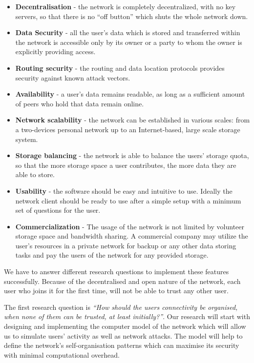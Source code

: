\begin{itemize}
\item \textbf{Decentralisation} - the network is completely decentralized,
      with no key servers, so that there is no ``off button'' which shuts
      the whole network down.
\item \textbf{Data Security} - all the user's data which is stored and transferred
      within the network is accessible only by its owner or a party to whom the
      owner is explicitly providing access.
\item \textbf{Routing security} - the routing and data location protocols
      provides security against known attack vectors.
\item \textbf{Availability} - a user's data remains readable,
      as long as a sufficient amount of peers who hold that data remain online.
\item \textbf{Network scalability} - the network can be established in various
      scales: from a two-devices personal network up to an Internet-based,
      large scale storage system.
\item \textbf{Storage balancing} - the network is able to balance the users'
      storage quota, so that the more storage space a user contributes,
      the more data they are able to store.
\item \textbf{Usability} - the software should be easy and intuitive to
      use. Ideally the network client should be ready to use after a
      simple setup with a minimum set of questions for the user.
\item \textbf{Commercialization} - The usage of the network is not limited
      by volunteer storage space and bandwidth sharing. A commercial company
      may utilize the user's resources in a private network for backup or any
      other data storing tasks and pay the users of the network for any
      provided storage.
\end{itemize}

We have to answer different research questions to implement these features
successfully. Because of the decentralised and open nature of the network,
each user who joins it for the first time,  will not be able to trust any
other user.

The first research question is
\emph{``How should the users connectivity be organised,
when none of them can be trusted, at least initially?''}.
Our research will start with designing and implementing the computer model
of the network which will allow us to simulate users' activity as well as
\pp network attacks. The model will help to define the network's
self-organisation patterns which can maximise its security with minimal
computational overhead.

